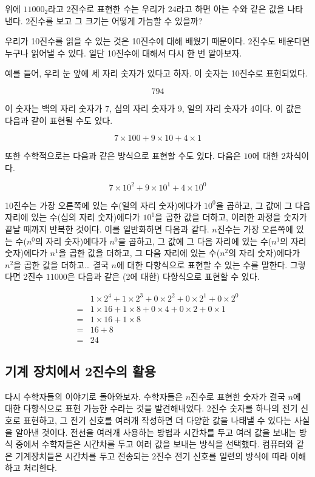 \documentclass{article}
\begin{document}
위에 $11000_2$라고 2진수로 표현한 수는 우리가 $24$라고 하면 아는 수와 같은 값을
나타낸다. 2진수를 보고 그 크기는 어떻게 가늠할 수 있을까?

우리가 10진수를 읽을 수 있는 것은 10진수에 대해 배웠기 때문이다. 2진수도 배운다면
누구나 읽어낼 수 있다. 일단 10진수에 대해서 다시 한 번 알아보자.

예를 들어, 우리 눈 앞에 세 자리 숫자가 있다고 하자. 이 숫자는 10진수로 표현되었다.

$$
794
$$

이 숫자는 백의 자리 숫자가 7, 십의 자리 숫자가 9, 일의 자리 숫자가 4이다.
이 값은 다음과 같이 표현될 수도 있다.

$$
7 \times 100 + 9 \times 10 + 4 \times 1
$$

또한 수학적으로는 다음과 같은 방식으로 표현할 수도 있다. 다음은 $10$에 대한
2차식이다.

$$
7 \times 10^2 + 9 \times 10^1 + 4 \times 10^0
$$

10진수는 가장 오른쪽에 있는 수(일의 자리 숫자)에다가 $10^0$을 곱하고, 그 값에
그 다음 자리에 있는 수(십의 자리 숫자)에다가 $10^1$을 곱한 값을 더하고,
이러한 과정을 숫자가 끝날 때까지 반복한 것이다. 이를 일반화하면 다음과 같다.
$n$진수는 가장 오른쪽에 있는 수($n^0$의 자리 숫자)에다가 $n^0$을 곱하고, 그 값에
그 다음 자리에 있는 수($n^1$의 자리 숫자)에다가 $n^1$을 곱한 값을 더하고,
그 다음 자리에 있는 수($n^2$의 자리 숫자)에다가 $n^2$을 곱한 값을 더하고\dots
결국 $n$에 대한 다항식으로 표현할 수 있는 수를 말한다.
그렇다면 2진수 $11000$은 다음과 같은 (2에 대한) 다항식으로 표현할 수 있다.

$$
\begin{aligned}
     & 1 \times 2^4 + 1 \times 2^3 + 0 \times 2^2 + 0 \times 2^1 + 0 \times 2^0 \\
    =& 1 \times 16 + 1 \times 8 + 0 \times 4 + 0 \times 2 + 0 \times 1 \\
    =& 1 \times 16 + 1 \times 8 \\
    =& 16 + 8 \\
    =& 24
\end{aligned}
$$

\subsection{기계 장치에서 2진수의 활용}

다시 수학자들의 이야기로 돌아와보자. 수학자들은 $n$진수로 표현한 숫자가 결국
$n$에 대한 다항식으로 표현 가능한 수라는 것을 발견해내었다. 2진수 숫자를 하나의
전기 신호로 표현하고, 그 전기 신호를 여러개 작성하면 더 다양한 값을 나태낼 수 있다는
사실을 알아낸 것이다. 전선을 여러개 사용하는 방법과 시간차를 두고 여러 값을 보내는
방식 중에서 수학자들은 시간차를 두고 여러 값을 보내는 방식을 선택했다. 컴퓨터와 같은
기계장치들은 시간차를 두고 전송되는 2진수 전기 신호를 일련의 방식에 따라 이해하고 처리한다.
\end{document}
